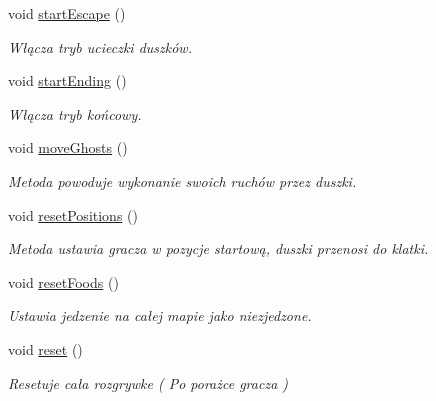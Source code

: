 \begin{DoxyCompactItemize}
\mbox{\label{classGameManager_a28be7667c0df647cd801b1a01831a849}} 
void \hyperlink{classGameManager_a28be7667c0df647cd801b1a01831a849}{start\+Escape} ()
\begin{DoxyCompactList}\small\item\em Włącza tryb ucieczki duszków. \end{DoxyCompactList}\item 
void \hyperlink{classGameManager_a68f66efe17738b9773ce193f032287eb}{start\+Ending} ()
\begin{DoxyCompactList}\small\item\em Włącza tryb końcowy. \end{DoxyCompactList}\item 
\mbox{\label{classGameManager_ab7d33de52cc8be9fb9f643a48c11d3b2}} 
void \hyperlink{classGameManager_ab7d33de52cc8be9fb9f643a48c11d3b2}{move\+Ghosts} ()
\begin{DoxyCompactList}\small\item\em Metoda powoduje wykonanie swoich ruchów przez duszki. \end{DoxyCompactList}\item 
\mbox{\label{classGameManager_ac8492e9ab2b4d660b8ca43fc27259b7e}} 
void \hyperlink{classGameManager_ac8492e9ab2b4d660b8ca43fc27259b7e}{reset\+Positions} ()
\begin{DoxyCompactList}\small\item\em Metoda ustawia gracza w pozycje startową, duszki przenosi do klatki. \end{DoxyCompactList}\item 
\mbox{\label{classGameManager_a132fab941b740b70c6a7534b25109fbc}} 
void \hyperlink{classGameManager_a132fab941b740b70c6a7534b25109fbc}{reset\+Foods} ()
\begin{DoxyCompactList}\small\item\em Ustawia jedzenie na całej mapie jako niezjedzone. \end{DoxyCompactList}\item 
\mbox{\label{classGameManager_a9085b8b46d54303a3111ba38a76f5db5}} 
void \hyperlink{classGameManager_a9085b8b46d54303a3111ba38a76f5db5}{reset} ()
\begin{DoxyCompactList}\small\item\em Resetuje cała rozgrywke ( Po porażce gracza ) \end{DoxyCompactList}\end{DoxyCompactItemize}
